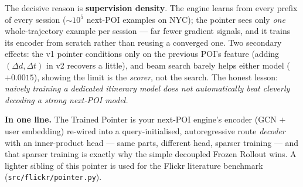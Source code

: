 \documentclass[11pt]{article}
\begin{document}
\noindent The decisive reason is \textbf{supervision density}. The engine learns from every prefix of
every session ($\sim$$10^5$ next-POI examples on NYC); the pointer sees only \emph{one}
whole-trajectory example per session --- far fewer gradient signals, and it trains its encoder from
scratch rather than reusing a converged one. Two secondary effects: the v1 pointer conditions only on
the previous POI's feature (adding $(\Delta d,\Delta t)$ in v2 recovers a little), and beam search
barely helps either model ($+0.0015$), showing the limit is the \emph{scorer}, not the search. The
honest lesson: \emph{naively training a dedicated itinerary model does not automatically beat
cleverly decoding a strong next-POI model.}

\begin{tcolorbox}[colback=svGrayT, colframe=svGray, arc=2pt, boxrule=0.6pt,
  left=6pt,right=6pt,top=4pt,bottom=4pt]
\textbf{In one line.} The Trained Pointer is your next-POI engine's encoder (GCN $+$ user embedding)
re-wired into a query-initialised, autoregressive route \emph{decoder} with an inner-product head ---
same parts, different head, sparser training --- and that sparser training is exactly why the simple
decoupled Frozen Rollout wins. A lighter sibling of this pointer is used for the Flickr literature
benchmark (\texttt{src/flickr/pointer.py}).
\end{tcolorbox}
\end{document}
